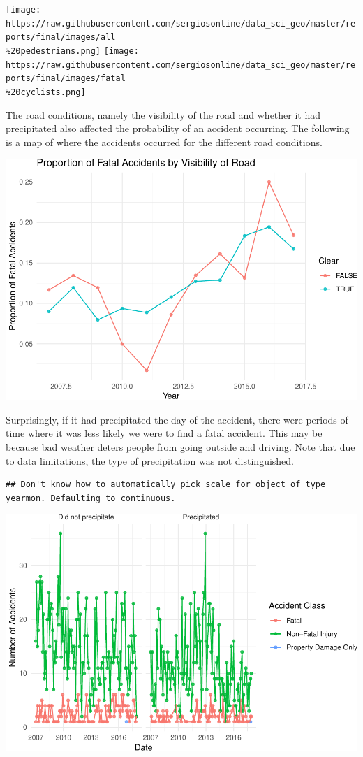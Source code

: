 \documentclass[]{article}
\begin{document}
\texttt{[image: https://raw.githubusercontent.com/sergiosonline/data\_sci\_geo/master/reports/final/images/all\\\%20pedestrians.png]}
\texttt{[image: https://raw.githubusercontent.com/sergiosonline/data\_sci\_geo/master/reports/final/images/fatal\\\%20cyclists.png]}

The road conditions, namely the visibility of the road and whether it
had precipitated also affected the probability of an accident occurring.
The following is a map of where the accidents occurred for the different
road conditions.

\includegraphics{Project_II-Final-20190404_files/figure-latex/unnamed-chunk-6-1.pdf}

Surprisingly, if it had precipitated the day of the accident, there were
periods of time where it was less likely we were to find a fatal
accident. This may be because bad weather deters people from going
outside and driving. Note that due to data limitations, the type of
precipitation was not distinguished.

\begin{verbatim}
## Don't know how to automatically pick scale for object of type yearmon. Defaulting to continuous.
\end{verbatim}

\includegraphics{Project_II-Final-20190404_files/figure-latex/unnamed-chunk-7-1.pdf}
\end{document}
